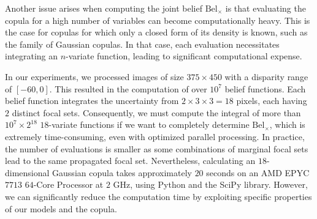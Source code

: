 Another issue arises when computing the joint belief $\mathrm{Bel}_\times$ is that evaluating the copula for a high number of variables can become computationally heavy. This is the case for copulas for which only a closed form of its density is known, such as the family of Gaussian copulas. In that case, each evaluation necessitates integrating an $n$-variate function, leading to significant computational expense.

In our experiments, we processed images of size $375 \times 450$ with a disparity range of $[-60, 0]$. This resulted in the computation of over $10^7$ belief functions. Each belief function integrates the uncertainty from $2 \times 3 \times 3 = 18$ pixels, each having $2$ distinct focal sets. Consequently, we must compute the integral of more than $10^7 \times 2 ^{18}$ $18$-variate functions if we want to completely determine $\mathrm{Bel}_\times$, which is extremely time-consuming, even with optimized parallel processing. In practice, the number of evaluations is smaller as some combinations of marginal focal sets lead to the same propagated focal set. Nevertheless, calculating an $18$-dimensional Gaussian copula takes approximately $20$ seconds on an AMD EPYC $7713$ $64$-Core Processor at $2$ GHz, using Python and the SciPy library. However, we can significantly reduce the computation time by exploiting specific properties of our models and the copula.

